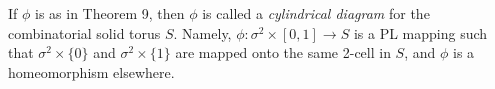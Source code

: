 If $\phi$ is as in Theorem 9, then $\phi$ is called a \emph{cylindrical diagram} for the combinatorial solid torus $S$. Namely, $\phi: \sigma^2 \times [0, 1] \rightarrow S$ is a PL mapping such that $\sigma^2 \times \{0\}$ and $\sigma^2 \times \{1\}$ are mapped onto the same 2-cell in $S$, and $\phi$ is a homeomorphism elsewhere.
